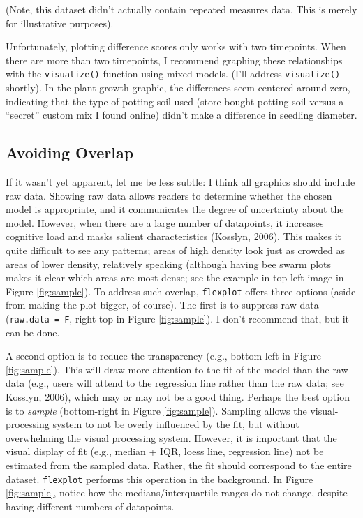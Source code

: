\documentclass[
  english,
  man]{apa6}
\begin{document}
\normalsize

\noindent (Note, this dataset didn't actually contain repeated measures data. This is merely for illustrative purposes).

Unfortunately, plotting difference scores only works with two timepoints. When there are more than two timepoints, I recommend graphing these relationships with the \texttt{visualize()} function using mixed models. (I'll address \texttt{visualize()} shortly). In the plant growth graphic, the differences seem centered around zero, indicating that the type of potting soil used (store-bought potting soil versus a ``secret'' custom mix I found online) didn't make a difference in seedling diameter.

\hypertarget{avoiding-overlap}{%
\subsection{Avoiding Overlap}\label{avoiding-overlap}}

If it wasn't yet apparent, let me be less subtle: I think all graphics should include raw data. Showing raw data allows readers to determine whether the chosen model is appropriate, and it communicates the degree of uncertainty about the model. However, when there are a large number of datapoints, it increases cognitive load and masks salient characteristics (Kosslyn, 2006). This makes it quite difficult to see any patterns; areas of high density look just as crowded as areas of lower density, relatively speaking (although having bee swarm plots makes it clear which areas are most dense; see the example in top-left image in Figure \ref{fig:sample}). To address such overlap, \texttt{flexplot} offers three options (aside from making the plot bigger, of course). The first is to suppress raw data (\texttt{raw.data\ =\ F}, right-top in Figure \ref{fig:sample}). I don't recommend that, but it can be done.

A second option is to reduce the transparency (e.g., bottom-left in Figure \ref{fig:sample}). This will draw more attention to the fit of the model than the raw data (e.g., users will attend to the regression line rather than the raw data; see Kosslyn, 2006), which may or may not be a good thing. Perhaps the best option is to \emph{sample} (bottom-right in Figure \ref{fig:sample}). Sampling allows the visual-processing system to not be overly influenced by the fit, but without overwhelming the visual processing system. However, it is important that the visual display of fit (e.g., median + IQR, loess line, regression line) not be estimated from the sampled data. Rather, the fit should correspond to the entire dataset. \texttt{flexplot} performs this operation in the background. In Figure \ref{fig:sample}, notice how the medians/interquartile ranges do not change, despite having different numbers of datapoints.
\end{document}
